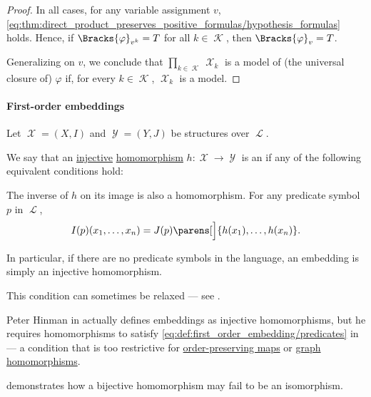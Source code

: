 \begin{proof}
  In all cases, for any variable assignment \( v \), \eqref{eq:thm:direct_product_preserves_positive_formulas/hypothesis_formulas} holds. Hence, if \( \Bracks{\varphi}_{v^k} = T \) for all \( k \in \mscrK \), then \( \Bracks{\varphi}_v = T \).

  Generalizing on \( v \), we conclude that \( \prod_{k \in \mscrK} \mscrX_k \) is a model of (the universal closure of) \( \varphi \) if, for every \( k \in \mscrK \), \( \mscrX_k \) is a model.
\end{proof}

\paragraph{First-order embeddings}

\begin{definition}\label{def:first_order_embedding}
  Let \( \mscrX = (X, I) \) and \( \mscrY = (Y, J) \) be structures over \( \mscrL \).

  We say that an \hyperref[def:function_invertibility/injective]{injective} \hyperref[def:first_order_homomorphism]{homomorphism} \( h: \mscrX \to \mscrY \) is an  if any of the following equivalent conditions hold:

  \begin{thmenum}
     The inverse of \( h \) on its image is also a homomorphism.
     For any predicate symbol \( p \) in \( \mscrL \),
    \begin{equation}\label{eq:def:first_order_embedding/predicates}
      I(p) (x_1, \ldots, x_n) = J(p) \parens[\Big]{ h(x_1), \ldots, h(x_n) }.
    \end{equation}
  \end{thmenum}
\end{definition}
\begin{comments}
  \item In particular, if there are no predicate symbols in the language, an embedding is simply an injective homomorphism.

  \item This condition can sometimes be relaxed --- see .

  \item Peter Hinman in  actually defines embeddings as injective homomorphisms, but he requires homomorphisms to satisfy \eqref{eq:def:first_order_embedding/predicates} in \cite[def. 2.3.26(i)]{Hinman2005} --- a condition that is too restrictive for \hyperref[def:order_homomorphism]{order-preserving maps} or \hyperref[def:directed_graph/homomorphism]{graph homomorphisms}.

  \item {} demonstrates how a bijective homomorphism may fail to be an isomorphism.
\end{comments}
